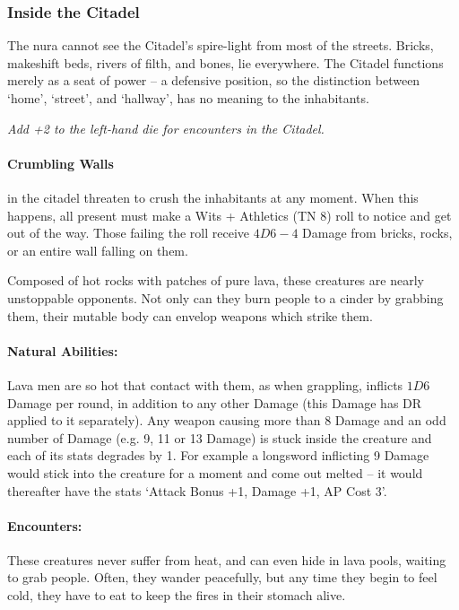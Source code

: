 \begin{multicols}{2}
\subsubsection{Inside the Citadel}

The nura cannot see the Citadel's spire-light from most of the streets.
Bricks, makeshift beds, rivers of filth, and bones, lie everywhere.
The Citadel functions merely as a seat of power -- a defensive position, so the distinction between `home', `street', and `hallway', has no meaning to the inhabitants.

\textit{Add +2 to the left-hand die for encounters in the Citadel.}


\paragraph{Crumbling Walls}
in the citadel threaten to crush the inhabitants at any moment.
When this happens, all present must make a Wits + Athletics (TN 8) roll to notice and get out of the way.
Those failing the roll receive $4D6-4$ Damage from bricks, rocks, or an entire wall falling on them.

\label{lavaman}

Composed of hot rocks with patches of pure lava, these creatures are nearly unstoppable opponents.
Not only can they burn people to a cinder by grabbing them, their mutable body can envelop weapons which strike them.

\paragraph{Natural Abilities:} Lava men are so hot that contact with them, as when grappling, inflicts $1D6$ Damage per round, in addition to any other Damage (this Damage has DR applied to it separately).
Any weapon causing more than 8 Damage and an odd number of Damage (e.g. 9, 11 or 13 Damage) is stuck inside the creature and each of its stats degrades by 1.
For example a longsword inflicting 9 Damage would stick into the creature for a moment and come out melted -- it would thereafter have the stats `Attack Bonus +1, Damage +1, AP Cost 3'.

\paragraph{Encounters:} These creatures never suffer from heat, and can even hide in lava pools, waiting to grab people.
Often, they wander peacefully, but any time they begin to feel cold, they have to eat to keep the fires in their stomach alive.

\end{multicols}
